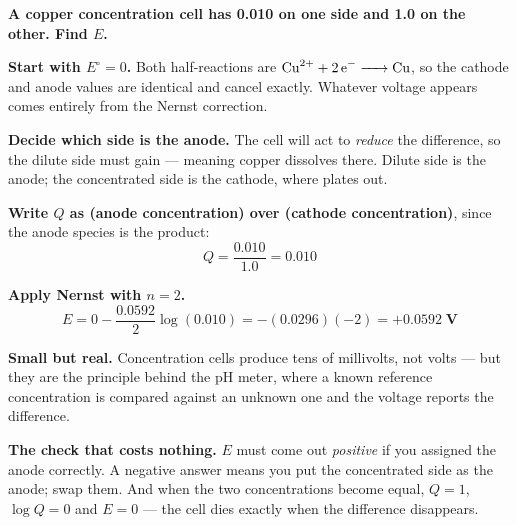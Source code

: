 \documentclass{apchem-worksheet}
\begin{document}
\begin{workedexample}
\textbf{A copper concentration cell has \SI{0.010}{\Molar} 
on one side and \SI{1.0}{\Molar} on the other. Find $E$.}

\textbf{Start with $E^{\circ} = 0$.} Both half-reactions are
$\ce{Cu^2+ + 2e- -> Cu}$, so the cathode and anode values are identical
and cancel exactly. Whatever voltage appears comes entirely from the
Nernst correction.

\textbf{Decide which side is the anode.} The cell will act to
\emph{reduce} the difference, so the dilute side must gain 
--- meaning copper dissolves there. Dilute side is the anode; the
concentrated side is the cathode, where  plates out.

\textbf{Write $Q$ as (anode concentration) over (cathode
concentration)}, since the anode species is the product:
\[ Q = \frac{0.010}{1.0} = 0.010 \]

\textbf{Apply Nernst with $n = 2$.}
\[ E = 0 - \frac{0.0592}{2}\log(0.010)
     = -(0.0296)(-2) = \mathbf{+0.0592\;\text{V}} \]

\textbf{Small but real.} Concentration cells produce tens of millivolts,
not volts --- but they are the principle behind the pH meter, where a
known reference concentration is compared against an unknown one and the
voltage reports the difference.

\textbf{The check that costs nothing.} $E$ must come out
\emph{positive} if you assigned the anode correctly. A negative answer
means you put the concentrated side as the anode; swap them. And when
the two concentrations become equal, $Q = 1$, $\log Q = 0$ and
$E = 0$ --- the cell dies exactly when the difference disappears.
\end{workedexample}
\end{document}
